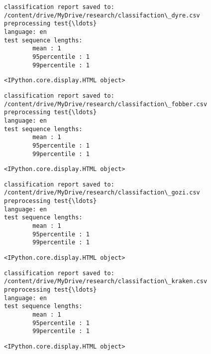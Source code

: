 \documentclass[11pt]{article}
\begin{document}
    
    \begin{Verbatim}[commandchars=\\\{\}]
classification report saved to:
/content/drive/MyDrive/research/classifaction\_dyre.csv
preprocessing test{\ldots}
language: en
test sequence lengths:
        mean : 1
        95percentile : 1
        99percentile : 1
    \end{Verbatim}

    
    \begin{Verbatim}[commandchars=\\\{\}]
<IPython.core.display.HTML object>
    \end{Verbatim}

    
    \begin{Verbatim}[commandchars=\\\{\}]
classification report saved to:
/content/drive/MyDrive/research/classifaction\_fobber.csv
preprocessing test{\ldots}
language: en
test sequence lengths:
        mean : 1
        95percentile : 1
        99percentile : 1
    \end{Verbatim}

    
    \begin{Verbatim}[commandchars=\\\{\}]
<IPython.core.display.HTML object>
    \end{Verbatim}

    
    \begin{Verbatim}[commandchars=\\\{\}]
classification report saved to:
/content/drive/MyDrive/research/classifaction\_gozi.csv
preprocessing test{\ldots}
language: en
test sequence lengths:
        mean : 1
        95percentile : 1
        99percentile : 1
    \end{Verbatim}

    
    \begin{Verbatim}[commandchars=\\\{\}]
<IPython.core.display.HTML object>
    \end{Verbatim}

    
    \begin{Verbatim}[commandchars=\\\{\}]
classification report saved to:
/content/drive/MyDrive/research/classifaction\_kraken.csv
preprocessing test{\ldots}
language: en
test sequence lengths:
        mean : 1
        95percentile : 1
        99percentile : 1
    \end{Verbatim}

    
    \begin{Verbatim}[commandchars=\\\{\}]
<IPython.core.display.HTML object>
    \end{Verbatim}
\end{document}
